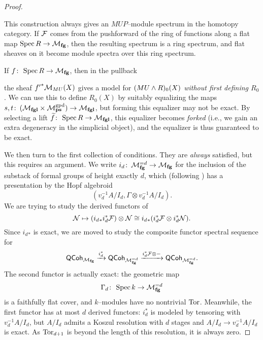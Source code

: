 \begin{proof}
\begin{remark}
This construction always gives an $MUP$--module spectrum in the homotopy category.  If $\mathcal{F}$ comes from the pushforward of the ring of functions along a flat map $\operatorname{Spec} R \to \mathcal{M}_{\mathbf{fg}}$, then the resulting spectrum is a ring spectrum, and flat sheaves on it become module spectra over this ring spectrum.
\end{remark}

\begin{remark}\label{PullingBackOverMfgVsMfgl}
If $f\colon\thinspace \operatorname{Spec} R \to \mathcal{M}_{\mathbf{fg}}$, then in the pullback
\begin{center}
\end{center}
the sheaf ${f'}^* \mathcal{M}_{MU}(X)$ gives a model for $(MU \wedge R)_0(X)$ \emph{without first defining $R_0$}.  We can use this to define $R_0(X)$ by suitably equalizing the maps $s, t\colon\thinspace (\mathcal{M}_{\mathbf{fgl}} \times \mathcal{M}_{\mathbf{ps}}^{\mathrm{gpd}}) \to \mathcal{M}_{\mathbf{fgl}}$, but forming this equalizer may not be exact.  By selecting a lift $\widetilde f\colon\thinspace \operatorname{Spec} R \to \mathcal{M}_{\mathbf{fgl}}$, this equalizer becomes \emph{forked} (i.e., we gain an extra degeneracy in the simplicial object), and the equalizer is thus guaranteed to be exact.  
\end{remark}

We then turn to the first collection of conditions.  They are \emph{always} satisfied, but this requires an argument.  We write $i_d\colon\thinspace \mathcal{M}_{\mathbf{fg}}^{= d} \to \mathcal{M}_{\mathbf{fg}}$ for the inclusion of the substack of formal groups of height exactly $d$, which (following ) has a presentation by the Hopf algebroid \[(v_d^{-1} A / I_d, \Gamma \otimes v_d^{-1} A / I_d).\]  We are trying to study the derived functors of \[\mathcal{N} \mapsto (i_d{}_* i_d^* \mathcal{F}) \otimes \mathcal{N} \cong i_d{}_* (i_d^* \mathcal{F} \otimes i_d^* \mathcal{N}).\]  Since $i_d{}_*$ is exact, we are moved to study the composite functor spectral sequence for \[\mathsf{QCoh}_{\mathcal{M}_{\mathbf{fg}}} \xrightarrow{i_d^*} \mathsf{QCoh}_{\mathcal{M}_{\mathbf{fg}}^{=d}} \xrightarrow{i_d^* \mathcal{F} \otimes -} \mathsf{QCoh}_{\mathcal{M}_{\mathbf{fg}}^{=d}}.\]  The second functor is actually exact: the geometric map \[\Gamma_d\colon\thinspace \operatorname{Spec} k \to \mathcal{M}_{\mathbf{fg}}^{=d}\] is a faithfully flat cover, and $k$--modules have no nontrivial $\operatorname{Tor}$.  Meanwhile, the first functor has at most $d$ derived functors: $i_d^*$ is modeled by tensoring with $v_d^{-1} A / I_d$, but $A / I_d$ admits a Koszul resolution with $d$ stages and $A / I_d \to v_d^{-1} A / I_d$ is exact.  As $\operatorname{Tor}_{d+1}$ is beyond the length of this resolution, it is always zero.
\end{proof}

